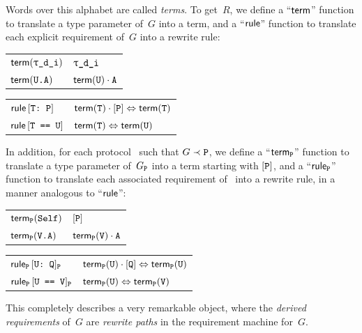 \documentclass[../generics]{subfiles}
\begin{document}
Words over this alphabet are called \emph{terms}. To get~$R$, we define a ``$\mathsf{term}$'' function to translate a type parameter of~$G$ into a term, and a ``$\mathsf{rule}$'' function to translate each explicit requirement of~$G$ into a rewrite rule:
\begin{center}
\begin{tabular}{l@{ $:=$ }l}
\toprule
$\Term(\ttgp{d}{i})$&$\ttgp{d}{i}$\\
$\mathsf{term}(\texttt{U.A})$&$\mathsf{term}(\texttt{U})\cdot\texttt{A}$\\
\bottomrule
\end{tabular}
\qquad
\begin{tabular}{l@{ $:=$ }l}
\toprule
\index{conformance requirement!in requirement machine}$\mathsf{rule}\, [\texttt{T:~P}]$&$\mathsf{term}(\texttt{T})\cdot[\texttt{P}]\Leftrightarrow\mathsf{term}(\texttt{T})$\\
\index{same-type requirement!in requirement machine}$\mathsf{rule}\, [\texttt{T == U}]$&$\mathsf{term}(\texttt{T})\Leftrightarrow\mathsf{term}(\texttt{U})$\\
\bottomrule
\end{tabular}
\end{center}
In addition, for each protocol \tP\ such that $G\prec\texttt{P}$, we define a ``$\mathsf{term}_{\texttt{P}}$'' function to translate a type parameter of~$G_{\texttt{P}}$ into a term starting with $[\texttt{P}]$, and a ``$\mathsf{rule}_{\texttt{P}}$'' function to translate each associated requirement of \tP\ into a rewrite rule, in a manner analogous to ``$\mathsf{rule}$'':
\begin{center}
\begin{tabular}{l@{ $:=$ }l}
\toprule
$\mathsf{term}_{\texttt{P}}(\texttt{Self})$&$[\texttt{P}]$\\
$\mathsf{term}_{\texttt{P}}(\texttt{V.A})$&$\mathsf{term}_{\texttt{P}}(\texttt{V})\cdot\texttt{A}$\\
\bottomrule
\end{tabular}
\qquad
\begin{tabular}{l@{ $:=$ }l}
\toprule
\index{associated conformance requirement!in requirement machine}$\mathsf{rule}_{\texttt{P}}\, [\texttt{U:~Q}]_{\texttt{P}}$&$\mathsf{term}_{\texttt{P}}(\texttt{U})\cdot[\texttt{Q}]\Leftrightarrow\mathsf{term}_{\texttt{P}}(\texttt{U})$\\
\index{associated same-type requirement!in requirement machine}$\mathsf{rule}_{\texttt{P}}\, [\texttt{U == V}]_{\texttt{P}}$&$\mathsf{term}_{\texttt{P}}(\texttt{U})\Leftrightarrow\mathsf{term}_{\texttt{P}}(\texttt{V})$\\
\bottomrule
\end{tabular}
\end{center}
This completely describes a very remarkable object, where the \emph{derived requirements} of~$G$ are \emph{rewrite paths} in the requirement machine for~$G$.
\end{document}
